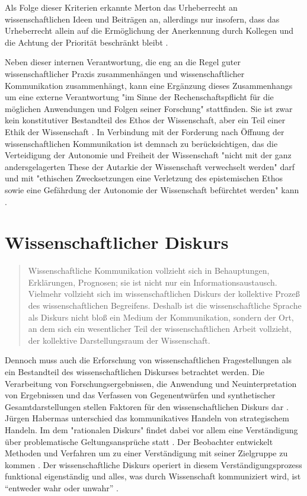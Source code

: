 Als Folge dieser Kriterien erkannte Merton das Urheberrecht an wissenschaftlichen Ideen und Beiträgen an, allerdings nur insofern, dass das Urheberrecht allein auf die Ermöglichung der Anerkennung durch Kollegen und die Achtung der Priorität beschränkt bleibt \cite{Fangerau_2014}.

Neben dieser internen Verantwortung, die eng an die Regel guter wissenschaftlicher Praxis zusammenhängen und wissenschaftlicher Kommunikation zusammenhängt, kann eine Ergänzung dieses Zusammenhangs um eine externe Verantwortung "im Sinne der Rechenschaftspflicht für die möglichen Anwendungen und Folgen seiner Forschung" \cite{Oezmen_2015} stattfinden. Sie ist zwar kein konstitutiver Bestandteil des Ethos der Wissenschaft, aber ein Teil einer Ethik der Wissenschaft \cite{Oezmen_2015}. In Verbindung mit der Forderung nach Öffnung der wissenschaftlichen Kommunikation ist demnach zu berücksichtigen, das die Verteidigung der Autonomie und Freiheit der Wissenschaft "nicht mit der ganz andersgelagerten These der Autarkie der Wissenschaft verwechselt werden" darf und mit "ethischen Zwecksetzungen eine Verletzung des epistemischen Ethos sowie eine Gefährdung der Autonomie der Wissenschaft befürchtet werden" kann \cite{Oezmen_2015}.

\section{Wissenschaftlicher Diskurs}

\begin{quote}Wissenschaftliche Kommunikation vollzieht sich in Behauptungen, Erklärungen, Prognosen; sie ist nicht nur ein Informationsaustausch. Vielmehr vollzieht sich im wissenschaftlichen Diskurs der kollektive Prozeß des wissenschaftlichen Begreifens. Deshalb ist die wissenschaftliche Sprache als Diskurs nicht bloß ein Medium der Kommunikation, sondern der Ort, an dem sich ein wesentlicher Teil der wissenschaftlichen Arbeit vollzieht, der kollektive Darstellungsraum der Wissenschaft. \cite{bohme_1978_wissenschaftssprachen}\end{quote}

Dennoch muss auch die Erforschung von wissenschaftlichen Fragestellungen als ein Bestandteil des wissenschaftlichen Diskurses\cite{suchen} betrachtet werden. Die Verarbeitung von Forschungsergebnissen, die Anwendung und Neuinterpretation von Ergebnissen und das Verfassen von Gegenentwürfen und synthetischer Gesamtdarstellungen stellen Faktoren für den wissenschaftlichen Diskurs dar \cite{suchen}. Jürgen Habermas unterschied das kommunikatives Handeln von strategischem Handeln. Im dem "rationalen Diskurs" findet dabei vor allem eine Verständigung über problematische Geltungsansprüche statt \cite{suchen}. Der Beobachter entwickelt Methoden und Verfahren um zu einer Verständigung mit seiner Zielgruppe zu kommen \cite{suchen}. Der wissenschaftliche Diskurs operiert in diesem Verständigungsprozess funktional eigenständig und alles, was durch Wissenschaft kommuniziert wird, ist “entweder wahr oder unwahr” \cite{Luhmann1998}.

